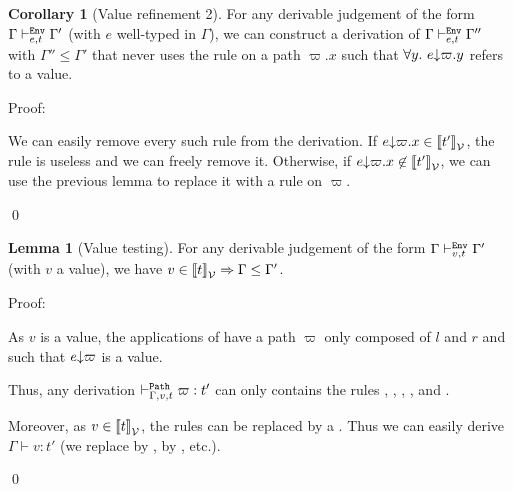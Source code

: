 \documentclass[a4paper]{article}
\theoremstyle{definition}
\newtheorem{lemma}{Lemma}
\newtheorem{corollary}{Corollary}
\begin{document}
        \begin{corollary}[Value refinement 2]
          For any derivable judgement of the form $\Gamma \vdash^{\texttt{Env}}_{e,t} \Gamma'$ (with $e$ well-typed in $\Gamma$), we can construct a derivation of $\Gamma \vdash^{\texttt{Env}}_{e,t} \Gamma''$ with $\Gamma''\leq\Gamma'$
          that never uses the rule  on a path $\varpi.x$ such that $\forall y.\ e{\downarrow}\varpi.y$ refers to a value.
        \end{corollary}

        Proof:

        We can easily remove every such rule from the derivation. If $e{\downarrow}\varpi.x \in {\llbracket t' \rrbracket}_{\mathcal{V}}$, the  rule is useless
        and we can freely remove it. Otherwise, if $e{\downarrow}\varpi.x \not\in {\llbracket t' \rrbracket}_{\mathcal{V}}$, we can use the previous lemma to
        replace it with a  rule on $\varpi$.

        \qed

        \begin{lemma}[Value testing]
          For any derivable judgement of the form $\Gamma \vdash^{\texttt{Env}}_{v,t} \Gamma'$ (with $v$ a value),
          we have $v \in {\llbracket t \rrbracket}_{\mathcal{V}} \Rightarrow \Gamma\leq\Gamma'$.
        \end{lemma}

        Proof:

        As $v$ is a value, the applications of  have a path $\varpi$ only composed of $l$ and $r$
        and such that $e{\downarrow}\varpi$ is a value.

        Thus, any derivation $\vdash^{\texttt{Path}}_{\Gamma,v,t} \varpi:t'$ can only contains the rules
        , , , ,  and .

        Moreover, as $v \in {\llbracket t \rrbracket}_{\mathcal{V}}$, the rules  can be replaced by a .
        Thus we can easily derive $\Gamma \vdash v:t'$ (we replace  by ,
         by , etc.).

        \qed
\end{document}
